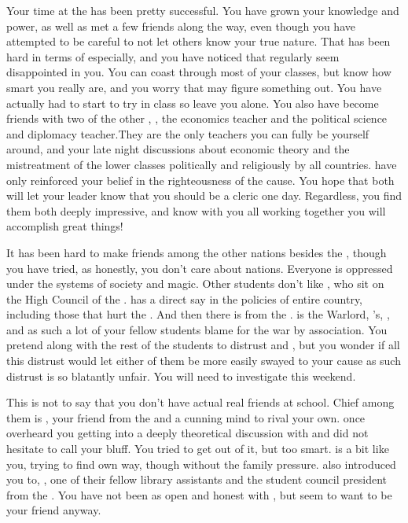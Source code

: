 \documentclass[char]{GL2020}
\begin{document}
Your time at the \pSchool{} has been pretty successful. You have grown your knowledge and power, as well as met a few friends along the way, even though you have attempted to be careful to not let others know your true nature. That has been hard in terms of \cHistory{} especially, and you have noticed that \cHistory{\they} regularly seem\cHistory{\verbs} disappointed in you. You can coast through most of your classes, but \cHistory{\they} know\cHistory{\verbs} how smart you really are, and you worry that \cHistory{\they} may figure something out. You have actually had to start to try in \cHistory{\their} class so \cHistory{\they} leave\cHistory{\verbs} you alone. You also have become friends with two of the other \pGoaties{}, \cChupSecond{\full}, the economics teacher and \cChupInventor{\full} the political science and diplomacy teacher.They are the only teachers you can fully be yourself around, and your late night discussions about economic theory and the mistreatment of the lower classes politically and religiously by all countries. have only reinforced your belief in the righteousness of the cause. You hope that both  will let your leader know that you should be a cleric one day. Regardless, you find them both deeply impressive, and know with you all working together you will accomplish great things!

 It has been hard to make friends among the other nations besides the \pFarm{}, though you have tried, as honestly, you don’t care about nations.  Everyone is oppressed under the systems of society and magic. Other students don’t like  \cTechStar{}, who sit\cTechStar{\verbs} on the High Council of the \pTech{}. \cTechStar{} has a direct say in the policies of \cTechStar{\their} entire country, including those that hurt the \pFarm{}. And then there is \cWarlordDaughter{\full} from the \pShip{}. \cWarlordDaughter{} is the \pShippie{} Warlord, \cLoud{\full}'s, \cWarlordDaughter{\offspring}, and as such a lot of your fellow students blame \cWarlordDaughter{\them} for the war by association. You pretend along with the rest of the \pFarm{} students to distrust \cTechStar{} and  \cWarlordDaughter{}, but you wonder if all this distrust would let either of them  be more easily swayed to your cause as such distrust is so blatantly unfair. You will need to investigate this weekend.

This is not to say that you don’t have actual real friends at school. Chief among them is \cAmbition{\full}, your friend from the \pTech{} and a cunning mind to rival your own. \cAmbition{} once overheard you getting into a deeply theoretical discussion with \cChupSecond{} and did not hesitate to call your bluff. You tried to get out of it, but \cAmbition{\theywere} too smart.  \cAmbition{} is a bit like you, trying to find \cAmbition{\their} own way, though without the family pressure.  \cAmbition{} also introduced you to, , one of their fellow library assistants and the student council president from the \pShip{}. You have not been as open and honest with \cPresident{}, but \cPresident{\they} seem\cPresident{\verbs} to want to be your friend anyway.  
\end{document}
